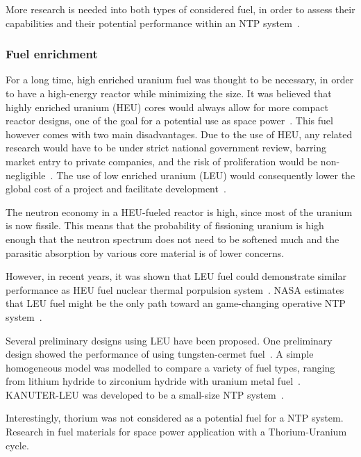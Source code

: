 \documentclass{article}
\begin{document}
More research is needed into both types of considered fuel, in order to assess their capabilities and their potential performance within an NTP system~\cite{qualls2017steps}.

\subsubsection{Fuel enrichment}

For a long time, high enriched uranium fuel was thought to be necessary, in order to have a high-energy reactor while minimizing the size. It was believed that highly enriched uranium (HEU) cores would always allow for more compact reactor designs, one of the goal for a potential use as space power~\cite{patel2016comparing}. This fuel however comes with two main disadvantages. Due to the use of HEU, any related research would have to be under strict national government review, barring market entry to private companies, and the risk of proliferation would be non-negligible~\cite{venneri2015feasibility}. The use of low enriched uranium (LEU) would consequently lower the global cost of a project and facilitate development~\cite{houts2014safe}.

The neutron economy in a HEU-fueled reactor is high, since most of the uranium is now fissile. This means that the probability of fissioning uranium is high enough that the neutron spectrum does not need to be softened much and the parasitic absorption by various core material is of lower concerns.

However, in recent years, it was shown that LEU fuel could demonstrate similar performance as HEU fuel nuclear thermal porpulsion system~\cite{ii2016engine,patel2016comparing}. NASA estimates that LEU fuel might be the only path toward an game-changing operative NTP system~\cite{houts2017low}.

Several preliminary designs using LEU have been proposed. One preliminary design showed the performance of using tungsten-cermet fuel~\cite{venneri2013nuclear}. A simple homogeneous model was modelled to compare a variety of fuel types, ranging from lithium hydride to zirconium hydride with uranium metal fuel~\cite{lee2015neutronic}. KANUTER-LEU was developed to be a small-size NTP system~\cite{nam2016preliminary}.

Interestingly, thorium was not considered as a potential fuel for a NTP system. Research in fuel materials for space power application with a Thorium-Uranium cycle.
\end{document}
